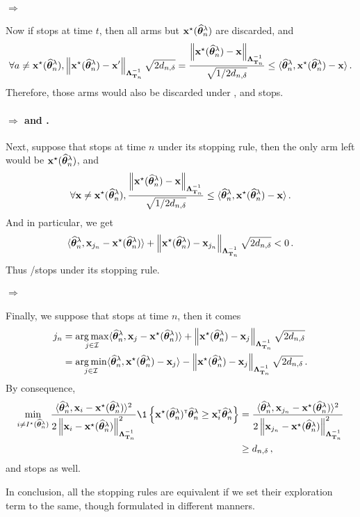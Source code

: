 \paragraph{\XYA{} $\Rightarrow$ \ALBA{}}
Now if \XYA stops at time $t$, then all arms but ${\bf x}^\star(\widehat{{\boldsymbol \theta}}_n^\lambda)$ are discarded, and
\[
    \forall a \neq {\bf x}^\star(\widehat{{\boldsymbol \theta}}_n^\lambda), \left\lVert{\bf x}^\star(\widehat{{\boldsymbol \theta}}_n^\lambda)-{\bf x}'\right\rVert_{{\boldsymbol \Lambda}_{{\bf T}_n}^{-1}}\sqrt{2d_{n,\delta}} = \dfrac{\left\lVert{\bf x}^\star(\widehat{{\boldsymbol \theta}}_n^\lambda)-{\bf x}\right\rVert_{{\boldsymbol \Lambda}_{{\bf T}_n}^{-1}}}{\sqrt{1/2d_{n,\delta}}} \le \langle\widehat{{\boldsymbol \theta}}_n^\lambda,{\bf x}^\star(\widehat{{\boldsymbol \theta}}_n^\lambda)-{\bf x}\rangle\,.
\]
Therefore, those arms would also be discarded under \ALBA, and \ALBA stops.

\paragraph{\ALBA{} $\Rightarrow$ \LGapE{} and \GLGapE{}.}
Next, suppose that \ALBA stops at time $n$ under its stopping rule, then the only arm left would be ${\bf x}^\star(\widehat{{\boldsymbol \theta}}_n^\lambda)$, and
\[
    \forall {\bf x} \neq {\bf x}^\star(\widehat{{\boldsymbol \theta}}_n^\lambda), \dfrac{\left\lVert{\bf x}^\star(\widehat{{\boldsymbol \theta}}_n^\lambda)-{\bf x}\right\rVert_{{\boldsymbol \Lambda}_{{\bf T}_n}^{-1}}}{\sqrt{1/2d_{n,\delta}}} \le \langle\widehat{{\boldsymbol \theta}}_n^\lambda,{\bf x}^\star(\widehat{{\boldsymbol \theta}}_n^\lambda)-{\bf x}\rangle\,.
\]
And in particular, we get
\[
    \langle\widehat{{\boldsymbol \theta}}_n^\lambda,{\bf x}_{j_n}-{\bf x}^\star(\widehat{{\boldsymbol \theta}}_n^\lambda)\rangle + \left\lVert{\bf x}^\star(\widehat{{\boldsymbol \theta}}_n^\lambda) - {\bf x}_{j_n}\right\rVert_{{\boldsymbol \Lambda}_{{\bf T}_n}^{-1}} \sqrt{2d_{n,\delta}} < 0\,.
\]
Thus \LGapE/\GLGapE stops under its stopping rule.

\paragraph{\LGapE{} $\Rightarrow$ \LG{}}
Finally, we suppose that \LGapE stops at time $n$, then it comes
\begin{align*}
    j_n &= \operatorname*{arg\,max}_{j\in\mathcal{I}} \langle\widehat{{\boldsymbol \theta}}_n^\lambda,{\bf x}_j-{\bf x}^\star(\widehat{{\boldsymbol \theta}}_n^\lambda)\rangle + \left\lVert{\bf x}^\star(\widehat{{\boldsymbol \theta}}_n^\lambda) - {\bf x}_j\right\rVert_{{\boldsymbol \Lambda}_{{\bf T}_n}^{-1}} \sqrt{2d_{n,\delta}} \\
    &= \operatorname*{arg\,min}_{j\in\mathcal{I}} \langle\widehat{{\boldsymbol \theta}}_n^\lambda,{\bf x}^\star(\widehat{{\boldsymbol \theta}}_n^\lambda)-{\bf x}_j\rangle - \left\lVert{\bf x}^\star(\widehat{{\boldsymbol \theta}}_n^\lambda) - {\bf x}_j\right\rVert_{{\boldsymbol \Lambda}_{{\bf T}_n}^{-1}} \sqrt{2d_{n,\delta}}\,.
\end{align*}
By consequence,
\begin{align*}
	\min_{i \neq \Istar(\hbtheta_n^\lambda)} \dfrac{\langle\hbtheta_n^\lambda,\bx_i-\bx^\star(\hbtheta_n^\lambda)\rangle^2}{2\normm{\bx_i - \bx^\star(\hbtheta_n^\lambda)}_{{\bLambda_{\bT_n}^{-1}}}^2} \1\left\{\bx^\star(\hbtheta_n^\lambda)^\top\hbtheta_n^\lambda \geq \bx_i^\top\hbtheta_n^\lambda\right\} &= \dfrac{\langle\hbtheta_n^\lambda,\bx_{j_n}-\bx^\star(\hbtheta_n^\lambda)\rangle^2}{2\normm{\bx_{j_n} - \bx^\star(\hbtheta_n^\lambda)}_{{\bLambda_{\bT_n}^{-1}}}^2}\\
	&\geq d_{n,\delta}\,,
\end{align*}
and \LG{} stops as well.

In conclusion, all the stopping rules are equivalent if we set their exploration term to the same, though formulated in different manners.